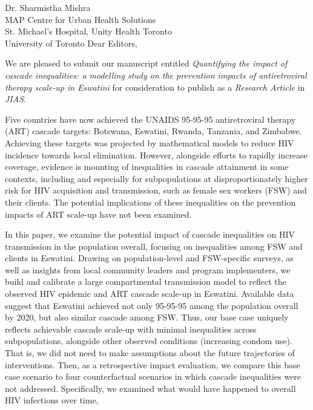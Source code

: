 \address{
  Prof. Kenneth H. Mayer \& Dr. Annette Sohn\\
  Editors-in-Chief\\
  Journal of the International AIDS Society
}{Dr. Sharmistha Mishra\\
  MAP Centre for Urban Health Solutions\\
  St. Michael's Hospital, Unity Health Toronto\\
  University of Toronto}
Dear Editors,
\par
We are pleased to submit our manuscript entitled
\emph{Quantifying the impact of cascade inequalities:
  a modelling study on the prevention impacts of antiretroviral therapy scale-up in Eswatini}
for consideration to publish as a \emph{Research Article} in \emph{JIAS}.
\par
Five countries have now achieved
the UNAIDS 95-95-95 antiretroviral therapy (ART) cascade targets:
Botswana, Eswatini, Rwanda, Tanzania, and Zimbabwe.
Achieving these targets was projected by
mathematical models to reduce HIV incidence towards local elimination.
However, alongside efforts to rapidly increase coverage,
evidence is mounting of inequalities in cascade attainment in some contexts,
including and especially for subpopulations
at disproportionately higher risk for HIV acquisition and transmission,
such as female sex workers (FSW) and their clients.
The potential implications of these inequalities on
the prevention impacts of ART scale-up have not been examined.
\par
In this paper, we examine the potential impact of
cascade inequalities on HIV transmission in the population overall,
focusing on inequalities among FSW and clients in Eswatini.
Drawing on population-level and FSW-specific surveys,
as well as insights from local community leaders and program implementers,
we build and calibrate a large compartmental transmission model
to reflect the observed HIV epidemic and ART cascade scale-up in Eswatini.
Available data suggest that Eswatini achieved not only
95-95-95 among the population overall by 2020, but also similar cascade among FSW.
Thus, our base case uniquely reflects achievable cascade scale-up
with minimal inequalities across subpopulations,
alongside other observed conditions (\eg increasing condom use).
That is, we did not need to make assumptions about
the future trajectories of interventions.
Then, as a retrospective impact evaluation, we compare
this base case scenario to four counterfactual scenarios in which
cascade inequalities were not addressed.
Specifically, we examined what would have happened to overall HIV infections over time,

